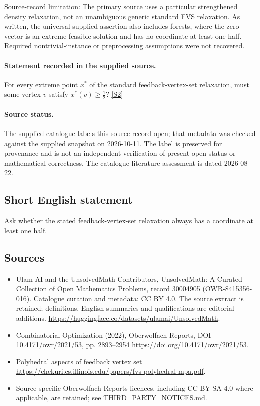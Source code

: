 \documentclass[11pt]{article}
\begin{document}
Source-record limitation: The primary source uses a particular strengthened density relaxation, not an unambiguous generic standard FVS relaxation. As written, the universal supplied assertion also includes forests, where the zero vector is an extreme feasible solution and has no coordinate at least one half. Required nontrivial-instance or preprocessing assumptions were not recovered.
\paragraph{Statement recorded in the supplied source.}
For every extreme point $x^*$ of the standard feedback-vertex-set relaxation, must some vertex $v$ satisfy $x^*(v)\geq\tfrac12$? \href{https://doi.org/10.4171/owr/2021/53}{[S2]}
\paragraph{Source status.}
The supplied catalogue labels this source record open; that metadata was checked against the supplied snapshot on 2026-10-11. The label is preserved for provenance and is not an independent verification of present open status or mathematical correctness. The catalogue literature assessment is dated 2026-08-22.
\subsection{Short English statement}
Ask whether the stated feedback-vertex-set relaxation always has a coordinate at least one half.
\subsection{Sources}
\begin{itemize}
\item[S1] Ulam AI and the UnsolvedMath Contributors, UnsolvedMath: A Curated Collection of Open Mathematics Problems, record 30004905 (OWR-8415356-016). Catalogue curation and metadata: CC BY 4.0. The source extract is retained; definitions, English summaries and qualifications are editorial additions.
\url{https://huggingface.co/datasets/ulamai/UnsolvedMath}.
\item[S2] Combinatorial Optimization (2022), Oberwolfach Reports, DOI 10.4171/owr/2021/53, pp. 2893--2954
\url{https://doi.org/10.4171/owr/2021/53}.
\item[S3] Polyhedral aspects of feedback vertex set
\url{https://chekuri.cs.illinois.edu/papers/fvs-polyhedral-mpa.pdf}.
\item Source-specific Oberwolfach Reports licences, including CC BY-SA 4.0 where applicable, are retained; see THIRD\_PARTY\_NOTICES.md.
\end{itemize}
\end{document}
